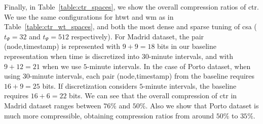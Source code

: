 	Finally, in Table~\ref{table:ctr_spaces}, we show the overall compression ratios of  \gls{ctr}.
	We use the same configurations for \gls{htwt} and \gls{wm}  as in Table~\ref{table:ctr_wt_spaces}, and both the
	most dense and sparse tuning of \gls{csa} ($t_{\Psi}= 32$ and $t_{\Psi}= 512$ respectively).
	For Madrid dataset, the pair (node,timestamp) is represented with $9+9=18$ bits in our baseline representation 
	when time is discretized into $30$-minute intervals, and with $9+12=21$ when we use $5$-minute intervals.
	In the case of Porto dataset, when using $30$-minute intervals, each pair (node,timestamp) from the baseline requires $16+9=25$ bits. 
	If discretization considers $5$-minute intervals, the baseline requires $16+6=22$ bits. We can see that the overall
	compression of \gls{ctr} in Madrid dataset ranges between $76\%$ and $50\%$. Also we show that Porto dataset is much
	more compressible, obtaining compression ratios from around $50\%$ to $35\%$.



